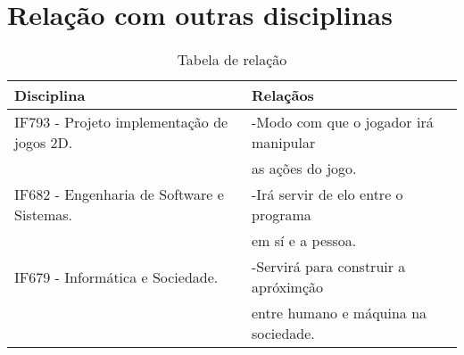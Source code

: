 \documentclass[10pt]{article}
\begin{document}
\section{Relação com outras disciplinas}
\begin{table}[h]
    \caption{Tabela de relação}
    \centering
    \begin{tabular}{| l | l |}
         \hline
         Disciplina & Relaçãos \\
        \hline
        IF793 - Projeto implementação de jogos 2D. & -Modo com que o jogador irá manipular\\& as ações do jogo.\\\hline
        IF682 - Engenharia de Software e Sistemas. & -Irá servir de elo entre o programa\\& em sí e a pessoa. \\\hline
        IF679 - Informática e Sociedade. & -Servirá para construir a apróximção \\&entre humano e máquina na sociedade.\\\hline
    \end{tabular}
    \label{tab:my_label}
\end{table}


\end{document}
